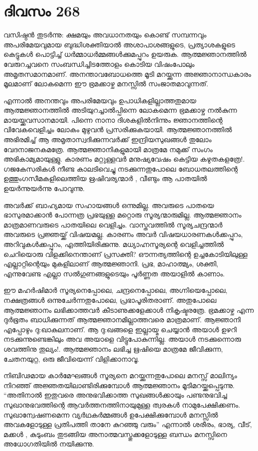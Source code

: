 \section{ദിവസം 268}


വസിഷ്ഠന്‍ തുടര്‍ന്നു: ക്ഷമയും അവധാനതയും കൊണ്ട് സമ്പന്നവും  അപരിമേയവുമായ ബുദ്ധിശക്തിയാല്‍ അശാപാശങ്ങളുടെ, പ്രത്യാശകളുടെ കെട്ടുകള്‍ പൊട്ടിച്ച് ധര്‍മ്മാധര്‍മ്മങ്ങള്‍ക്കുമപ്പുറം ഉയരുക. ആത്മജ്ഞാനത്തില്‍ വേരുറച്ചവനെ സംബന്ധിച്ചിടത്തോളം കൊടിയ വിഷംപോലും അമൃതസമാനമാണ്. അനന്താവബോധത്തെ മൂടി മറയ്ക്കുന്ന അജ്ഞാനാന്ധകാരം മൂലമാണ് ലോകമെന്ന ഈ ഭ്രമക്കാഴ്ച മനസ്സില്‍ സംജാതമാവുന്നത്.  

എന്നാല്‍ അനന്തവും അപരിമേയവും ഉപാധികളില്ലാത്തതുമായ ആത്മജ്ഞാനത്തില്‍ അടിയുറച്ചാല്‍പ്പിന്നെ ലോകമെന്ന ഭ്രമക്കാഴ്ച നല്‍കുന്ന മായയ്ക്കവസാനമായി. പിന്നെ നാനാ ദിശകളില്‍നിന്നും ജ്ഞാനത്തിന്റെ വിവേകവെളിച്ചം ലോകം മുഴുവന്‍ പ്രസരിക്കുകയായി. ആത്മജ്ഞാനത്തില്‍ അഭിരമിച്ച് ആ അമൃതാസ്വദിക്കുന്നവര്‍ക്ക് ഇന്ദ്രിയസുഖങ്ങള്‍ തുലോം വേദനാജനകമത്രേ. ആത്മജ്ഞാനികളുമായി മാത്രമേ നമുക്ക് സംഗം അഭികാമ്യമായുള്ളു. കാരണം മറ്റുള്ളവര്‍ മനുഷ്യവേഷം കെട്ടിയ കഴുതകളത്രേ!. ഗജകേസരികള്‍ നീണ്ട കാലടിവെച്ചു നടക്കുന്നതുപോലെ ബോധതലത്തിന്റെ ഉത്തുംഗസീമകളിലെത്തിയ ഋഷിവര്യന്മാര്‍ , വീണ്ടും ആ പാതയില്‍ ഉയര്‍ന്നുയര്‍ന്നു പോവുന്നു.

അവര്‍ക്ക് ബാഹ്യമായ സഹായങ്ങള്‍ ഒന്നുമില്ല. അവരുടെ പാതയെ ഭാസുരമാക്കാന്‍ പോന്നത്ര പ്രഭയുള്ള മറ്റൊരു സൂര്യന്മാരുമില്ല. ആത്മജ്ഞാനം മാത്രമാണവരുടെ പാതയിലെ വെളിച്ചം. വാസ്തവത്തില്‍ സൂര്യചന്ദ്രന്മാര്‍ അവരുടെ പ്രജ്ഞയ്ക്ക് വിഷയമല്ല. കാരണം അവര്‍ വിഷയധാരണകള്‍ക്കപ്പുറം, അറിവുകള്‍ക്കപ്പുറം,  എത്തിയിരിക്കുന്നു. മധ്യാഹ്നസൂര്യന്റെ വെളിച്ചത്തില്‍ ചെറിയൊരു വിളക്കിനെന്താണ് പ്രസക്തി? ഔന്നത്യത്തിന്റെ ഉച്ചകോടിയിലുള്ള എല്ലാറ്റിന്റെയും മുകളിലാണ് ആത്മജ്ഞാനി. പ്രഭ, മാഹാത്മ്യം, ശക്തി, എന്നുവേണ്ട എല്ലാ സല്‍ഗുണങ്ങളുടെയും പൂര്‍ണ്ണത അയാളില്‍ കാണാം. 
 
ഈ മഹര്‍ഷിമാര്‍ സൂര്യനെപ്പോലെ, ചന്ദ്രനെപ്പോലെ, അഗ്നിയെപ്പോലെ, നക്ഷത്രങ്ങള്‍ ഒന്നുചേര്‍ന്നതുപോലെ, പ്രഭാപൂരിതരാണ്. അതുപോലെ ആത്മജ്ഞാനം ലഭിക്കാത്തവര്‍ കീടാണുക്കളേക്കാള്‍ നികൃഷ്ടരത്രേ. ഭ്രമക്കാഴ്ച എന്ന ദുര്‍ഭൂതം ബാധിക്കുന്നത് ആത്മജ്ഞാനമില്ലാത്തവരെ മാത്രമാണ്. ആജ്ഞാനി എപ്പോഴും ദു:ഖാകുലനാണ്. ആ ദു:ഖങ്ങളെ ഇല്ലായ്മ ചെയ്യാന്‍ അയാള്‍ ഉഴറി നടക്കുന്നുണ്ടെങ്കിലും അവ അയാളെ വിട്ടുപോകുന്നില്ല. അയാള്‍ നടക്കുന്നൊരു ശവത്തിനു തുല്യം!. ആത്മജ്ഞാനം ലഭിച്ച ഋഷിയെ മാത്രമേ ജീവിക്കുന്ന, ചേതനയുറ്റ, ഒരു ജീവിയെന്ന് വിളിക്കാനാവൂ.  

നിബിഢമായ കാര്‍മേഘങ്ങള്‍ സൂര്യനെ മറയ്ക്കുന്നതുപോലെ മനസ്സ് മാലിന്യം നിറഞ്ഞ് അജ്ഞതയിലാണ്ടിരിക്കുമ്പോള്‍ ആത്മജ്ഞാനം മൂടിമറയ്ക്കപ്പെടുന്നു. “അതിനാല്‍ ഇതുവരെ അനുഭവിക്കാത്ത സുഖങ്ങള്‍ക്കായും പണ്ടനുഭവിച്ച സുഖാനുഭവത്തിന്റെ ആവര്‍ത്തനത്തിനായുമുള്ള ത്വരകള്‍ നാമുപേക്ഷിക്കണം.  സുഖാന്വേഷണമെന്ന വ്യര്‍ഥകര്‍മ്മങ്ങള്‍ ഉപേക്ഷിക്കുമ്പോള്‍ മനസ്സില്‍ അവകളോടുള്ള പ്രതിപത്തി താനേ കുറഞ്ഞു വരും” എന്നാല്‍ ശരീരം, ഭാര്യ, വീട്, മക്കള്‍ , കുടുംബം തുടങ്ങിയ അനാത്മവസ്തുക്കളോടുള്ള ബന്ധം മനസ്സിനെ അധോഗതിയില്‍ നയിക്കുന്നു.

